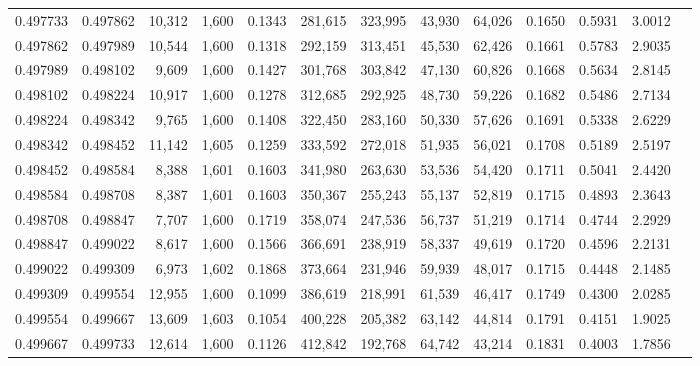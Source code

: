 \begin{tabular}{rrrrrrrrrrrrr}
0.497733 & 0.497862 & 10,312 & 1,600 &                                     0.1343 & 281,615 & 323,995 &  43,930 &  64,026 & 0.1650 & 0.5931 & 3.0012 \\
0.497862 & 0.497989 & 10,544 & 1,600 &                                     0.1318 & 292,159 & 313,451 &  45,530 &  62,426 & 0.1661 & 0.5783 & 2.9035 \\
0.497989 & 0.498102 &  9,609 & 1,600 &                                     0.1427 & 301,768 & 303,842 &  47,130 &  60,826 & 0.1668 & 0.5634 & 2.8145 \\
0.498102 & 0.498224 & 10,917 & 1,600 &                                     0.1278 & 312,685 & 292,925 &  48,730 &  59,226 & 0.1682 & 0.5486 & 2.7134 \\
0.498224 & 0.498342 &  9,765 & 1,600 &                                     0.1408 & 322,450 & 283,160 &  50,330 &  57,626 & 0.1691 & 0.5338 & 2.6229 \\
0.498342 & 0.498452 & 11,142 & 1,605 &                                     0.1259 & 333,592 & 272,018 &  51,935 &  56,021 & 0.1708 & 0.5189 & 2.5197 \\
0.498452 & 0.498584 &  8,388 & 1,601 &                                     0.1603 & 341,980 & 263,630 &  53,536 &  54,420 & 0.1711 & 0.5041 & 2.4420 \\
0.498584 & 0.498708 &  8,387 & 1,601 &                                     0.1603 & 350,367 & 255,243 &  55,137 &  52,819 & 0.1715 & 0.4893 & 2.3643 \\
0.498708 & 0.498847 &  7,707 & 1,600 &                                     0.1719 & 358,074 & 247,536 &  56,737 &  51,219 & 0.1714 & 0.4744 & 2.2929 \\
0.498847 & 0.499022 &  8,617 & 1,600 &                                     0.1566 & 366,691 & 238,919 &  58,337 &  49,619 & 0.1720 & 0.4596 & 2.2131 \\
0.499022 & 0.499309 &  6,973 & 1,602 &                                     0.1868 & 373,664 & 231,946 &  59,939 &  48,017 & 0.1715 & 0.4448 & 2.1485 \\
0.499309 & 0.499554 & 12,955 & 1,600 &                                     0.1099 & 386,619 & 218,991 &  61,539 &  46,417 & 0.1749 & 0.4300 & 2.0285 \\
0.499554 & 0.499667 & 13,609 & 1,603 &                                     0.1054 & 400,228 & 205,382 &  63,142 &  44,814 & 0.1791 & 0.4151 & 1.9025 \\
0.499667 & 0.499733 & 12,614 & 1,600 &                                     0.1126 & 412,842 & 192,768 &  64,742 &  43,214 & 0.1831 & 0.4003 & 1.7856 \\

\end{tabular}
